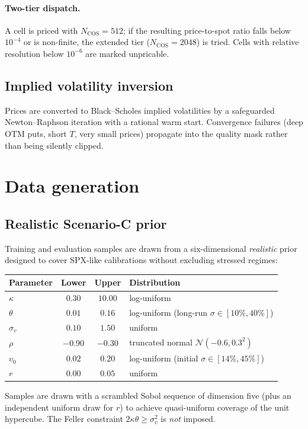 \documentclass[11pt,a4paper]{article}
\begin{document}
\paragraph{Two-tier dispatch.}
A cell is priced with $N_{\text{COS}}=512$; if the resulting
price-to-spot ratio falls below $10^{-4}$ or is non-finite, the
extended tier ($N_{\text{COS}}=2048$) is tried. Cells with
relative resolution below $10^{-6}$ are marked unpricable.

\subsection{Implied volatility inversion}

Prices are converted to Black--Scholes implied volatilities by a safeguarded
Newton--Raphson iteration with a rational warm start. Convergence failures
(deep OTM puts, short $T$, very small prices) propagate into the quality
mask rather than being silently clipped.

\section{Data generation}
\label{sec:datagen}

\subsection{Realistic Scenario-C prior}
\label{sec:prior}

Training and evaluation samples are drawn from a six-dimensional
\emph{realistic} prior designed to cover SPX-like calibrations without
excluding stressed regimes:
\begin{center}
\begin{tabular}{lccl}
  \toprule
  Parameter & Lower & Upper & Distribution \\
  \midrule
  $\kappa$    & $0.30$    & $10.00$  & log-uniform \\
  $\theta$    & $0.01$    & $0.16$   & log-uniform (long-run $\sigma\in[10\%,40\%]$) \\
  $\sigma_v$  & $0.10$    & $1.50$   & uniform \\
  $\rho$      & $-0.90$   & $-0.30$  & truncated normal $\mathcal{N}(-0.6,0.3^2)$ \\
  $v_0$       & $0.02$    & $0.20$   & log-uniform (initial $\sigma\in[14\%,45\%]$) \\
  $r$         & $0.00$    & $0.05$   & uniform \\
  \bottomrule
\end{tabular}
\end{center}
Samples are drawn with a scrambled Sobol sequence of dimension five
(plus an independent uniform draw for $r$) to achieve quasi-uniform
coverage of the unit hypercube. The Feller constraint
$2\kappa\theta \ge \sigma_v^2$ is \emph{not} imposed.
\end{document}
